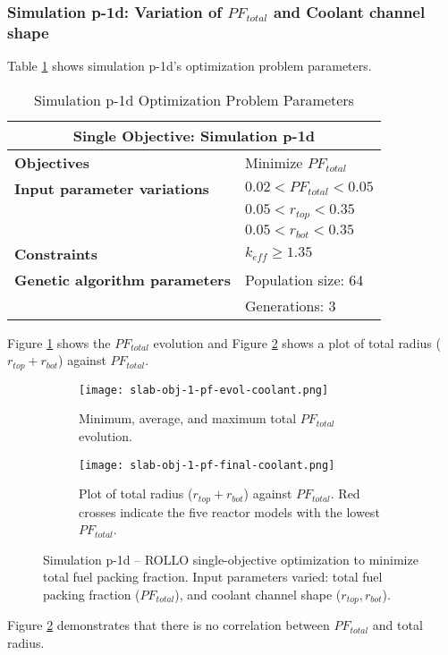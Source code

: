 \subsubsection{Simulation p-1d: Variation of $PF_{total}$ and Coolant channel shape}
Table \ref{tab:simulationp1d} shows simulation p-1d's optimization problem parameters. 
\begin{table}[htbp!]
    \centering
    \onehalfspacing
    \caption{Simulation p-1d Optimization Problem Parameters}
	\label{tab:simulationp1d}
    \footnotesize
    \begin{tabular}{l|p{5cm}}
    \hline 
    \multicolumn{2}{c}{\textbf{Single Objective: Simulation p-1d}} \\
    \hline 
    \textbf{Objectives} & Minimize $PF_{total}$\\
    \hline 
    \textbf{Input parameter variations} & $0.02<PF_{total}<0.05$ \\
    & $0.05<r_{top}<0.35$ \\
    & $0.05<r_{bot}<0.35$ \\
    \hline
    \textbf{Constraints} & $k_{eff} \geq 1.35$\\ 
    \hline 
    \textbf{Genetic algorithm parameters} & Population size: 64 \\
    & Generations: 3 \\
    \hline
    \end{tabular}
\end{table}

Figure \ref{fig:slab-obj-1-pf-evol-coolant} shows the $PF_{total}$ evolution 
and Figure \ref{fig:slab-obj-1-pf-final-coolant} shows a plot of total radius 
($r_{top} + r_{bot}$) against $PF_{total}$. 
\begin{figure}[htbp!]
    \centering
    \begin{subfigure}{\textwidth}
        \texttt{[image: slab-obj-1-pf-evol-coolant.png]}
        \caption{Minimum, average, and maximum total $PF_{total}$ evolution.}
        \label{fig:slab-obj-1-pf-evol-coolant} 
    \end{subfigure}
    \begin{subfigure}{\textwidth}
        \texttt{[image: slab-obj-1-pf-final-coolant.png]}
        \caption{Plot of total radius ($r_{top} + r_{bot}$) against $PF_{total}$. 
        Red crosses indicate the five reactor models with the 
        lowest $PF_{total}$.}
        \label{fig:slab-obj-1-pf-final-coolant} 
    \end{subfigure}
    \caption{Simulation p-1d -- ROLLO single-objective optimization to minimize 
    total fuel packing fraction. Input parameters varied: total fuel packing fraction 
    ($PF_{total}$), and coolant channel shape ($r_{top}, r_{bot}$).}
    \label{fig:slab-obj-1-pf-coolant}
\end{figure}
Figure \ref{fig:slab-obj-1-pf-final-coolant} demonstrates that there is no correlation 
between $PF_{total}$ and total radius. 

